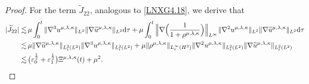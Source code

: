 \documentclass[reqno,11pt]{amsart}
\theoremstyle{plain}
\numberwithin{equation}{section}
\newcommand{\eps}{{\varepsilon}}
\begin{document}
\begin{proof}
For the term $\widetilde{J}_{22}$, analogous to \eqref{LNXG4.18}, we derive that 
\begin{align}\label{G4.22}
|\widetilde{J}_{22}|\lesssim&\, \mu \int_0^t\|\nabla^3u^{\mu,\lambda,\kappa}\|_{L^2} \|\nabla\widetilde{u}^{\mu,\lambda,\kappa}\|_{L^2}{\rm d}\tau+\mu\int_0^t \Big\|\nabla\Big( \frac{1}{1+\rho^{\mu,\lambda,\kappa}} \Big)\Big\|_{L^\infty}\|\nabla^2 u^{\mu,\lambda,\kappa}\|_{L^2}\|\nabla\widetilde{u}^{\mu,\lambda,\kappa}\|_{L^2}{\rm d}\tau\nonumber\\
\lesssim&\, \mu\|\nabla\widetilde{u}^{\mu,\lambda,\kappa}\|_{L_t^2(L^2)}\|\nabla^3 u^{\mu,\lambda,\kappa}\|_{L_t^2(L^2)}+\mu\|\rho^{\mu,\lambda,\kappa}\|_{L_t^\infty(H^3)}\|\nabla^2 u^{\mu,\lambda,\kappa}\|_{L_t^2(L^2)} \|\nabla\widetilde{u}^{\mu,\lambda,\kappa}\|_{L_t^2(L^2)}\nonumber\\
\lesssim&\, \big(\eps_0^\frac{1}{2}+\eps_1^\frac{1}{2}\big){\Xi} ^{\mu,\lambda,\kappa}(t)+\mu^2.
\end{align} 


\end{proof}
\end{document}
